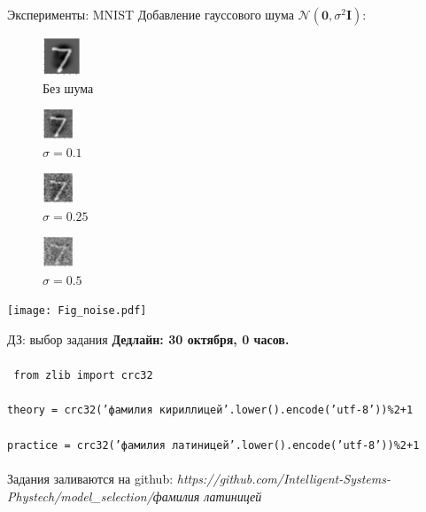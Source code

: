 \documentclass[10pt,pdf,utf8,russian,aspectratio=169]{beamer}
\begin{document}
\begin{frame}{Эксперименты: MNIST}
Добавление гауссового шума $\mathcal{N}(\mathbf{0},\sigma^2\mathbf{I})$:
\setlength{\columnsep}{10pt}
\begin{multicols}{4}
\begin{figure}[h]
\includegraphics[width=0.10\textwidth]{./mnist0.png}
\caption*{Без шума}
\end{figure}

\begin{figure}[h]
\includegraphics[width=0.08\textwidth]{./mnist10.png}
\caption*{$\sigma=0.1$}
\end{figure}

\begin{figure}[h]
\includegraphics[width=0.08\textwidth]{./mnist25.png}
\caption*{$\sigma=0.25$}
\end{figure}

\begin{figure}[h]
\includegraphics[width=0.08\textwidth]{./mnist50.png}
\caption*{$\sigma=0.5$}
\end{figure}
\end{multicols}
\begin{center}
\texttt{[image: Fig\_noise.pdf]}
\end{center}
\end{frame}

\begin{frame}{ДЗ: выбор задания}
\textbf{Дедлайн: 30 октября, 0 часов.}\\~\\

\texttt{ from zlib import crc32}\\~\\
\texttt{theory = crc32('фамилия кириллицей'.lower().encode('utf-8'))\%2+1}\\~\\
\texttt{practice = crc32('фамилия латиницей'.lower().encode('utf-8'))\%2+1}\\~\\

Задания заливаются на github:
\textit{https://github.com/Intelligent-Systems-Phystech/model\_selection/фамилия латиницей}\\

\end{frame}
\end{document}
